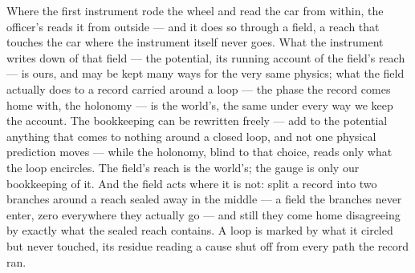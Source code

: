 Where the first instrument rode the wheel and read the car from within, the officer's reads it from outside ---
and it does so through a field, a reach that touches the car where the instrument itself never goes. What the
instrument writes down of that field --- the potential, its running account of the field's reach --- is ours,
and may be kept many ways for the very same physics; what the field actually does to a record carried around a
loop --- the phase the record comes home with, the holonomy --- is the world's, the same under every way we
keep the account. The bookkeeping can be rewritten freely --- add to the potential anything that comes to
nothing around a closed loop, and not one physical prediction moves --- while the holonomy, blind to that
choice, reads only what the loop encircles. The field's reach is the world's; the gauge is only our bookkeeping
of it. And the field acts where it is not: split a record into two branches around a reach sealed away in the
middle --- a field the branches never enter, zero everywhere they actually go --- and still they come home
disagreeing by exactly what the sealed reach contains. A loop is marked by what it circled but never touched,
its residue reading a cause shut off from every path the record ran.

